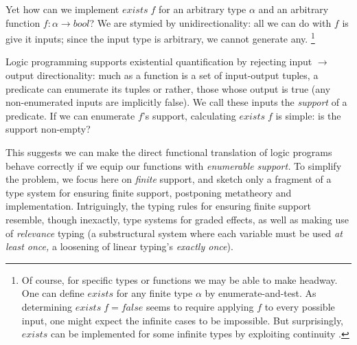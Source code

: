 \documentclass[sigplan, screen, dvipsnames]{acmart}
\newcommand\todo[1]{{\color{ACMRed}#1}}
\newcommand\name[1]{\ensuremath{\mathit{#1}}}
\newcommand\<\;                 %
\newcommand\tbool{\name{bool}}
\begin{document}
\noindent
Yet how can we implement $\name{exists} \< f$ for an arbitrary type $\alpha$ and an arbitrary function $f : \alpha \to \tbool$?
We are stymied by unidirectionality: all we can do with $f$ is give it inputs; since the input type is arbitrary, we cannot generate any.%
\footnote{
  Of course, for specific types or functions we may be able to make headway.
  One can define \name{exists} for any finite type $\alpha$ by enumerate-and-test.
  As determining $\name{exists}\<f = \name{false}$ seems to require applying $f$ to every possible input, one might expect the infinite cases to be impossible.
  But surprisingly, \name{exists} can be implemented for some infinite types by exploiting continuity \citep{seemingly-impossible-functional-programs}.
}

Logic programming supports existential quantification by rejecting input $\rightarrow$ output directionality:
much as a function is a set of input-output tuples, a predicate can enumerate its tuples \emdash or rather, those whose output is true (any non-enumerated inputs are implicitly false).
%
We call these inputs the \emph{support} of a predicate.
%
If we can enumerate $f$'s support, calculating $\name{exists}\<f$ is simple: is the support non-empty?

This suggests we can make the direct functional translation of logic programs behave correctly if we equip our functions with \emph{enumerable support.}
%
\todo{To simplify the problem,} we focus here on \emph{finite} support, and sketch only a fragment of a type system for ensuring finite support, postponing metatheory and implementation.
%
Intriguingly, the typing rules for ensuring finite support resemble, though inexactly, type systems for graded effects, as well as making use of \emph{relevance} typing (a substructural system where each variable must be used \emph{at least once,} a loosening of linear typing's \emph{exactly once}).


\end{document}
